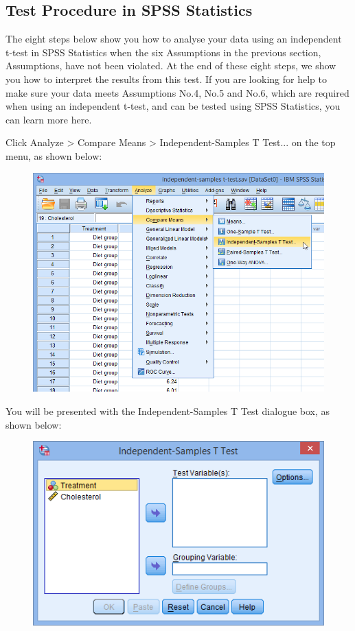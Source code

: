 \documentclass[]{article}
\begin{document}
\subsection{Test Procedure in SPSS Statistics}
	The eight steps below show you how to analyse your data using an independent t-test in SPSS Statistics when the six Assumptions in the previous section, Assumptions, have not been violated. At the end of these eight steps, we show you how to interpret the results from this test. If you are looking for help to make sure your data meets Assumptions No.4, No.5 and No.6, which are required when using an independent t-test, and can be tested using SPSS Statistics, you can learn more here.
	
	Click Analyze > Compare Means > Independent-Samples T Test... on the top menu, as shown below:
	
\begin{figure}[h!]
\centering
\includegraphics[width=0.5\linewidth]{TwoSample/TwoSampleMenu1}

\label{fig:TwoSampleMenu1}
\end{figure}\medskip

\noindent You will be presented with the Independent-Samples T Test dialogue box, as shown below:
	
\begin{figure}[h!]
	\centering
	\includegraphics[width=0.5\linewidth]{TwoSample/TwoSampleMenu2}

	\label{fig:TwoSampleMenu2}
\end{figure}\medskip
\end{document}
